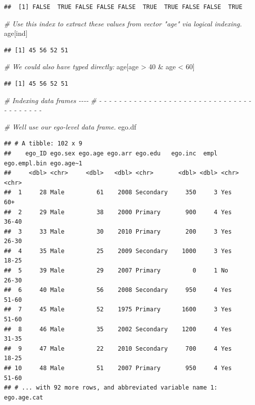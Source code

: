 \documentclass[
]{book}
\newenvironment{Shaded}{\begin{snugshade}}{\end{snugshade}}
\newcommand{\CommentTok}[1]{\textcolor[rgb]{0.56,0.35,0.01}{\textit{#1}}}
\newcommand{\DecValTok}[1]{\textcolor[rgb]{0.00,0.00,0.81}{#1}}
\newcommand{\NormalTok}[1]{#1}
\newcommand{\SpecialCharTok}[1]{\textcolor[rgb]{0.00,0.00,0.00}{#1}}
\begin{document}
\begin{verbatim}
##  [1] FALSE  TRUE FALSE FALSE FALSE  TRUE  TRUE FALSE FALSE  TRUE
\end{verbatim}

\begin{Shaded}
\begin{Highlighting}[]
\CommentTok{\# Use this index to extract these values from vector "age" via logical indexing.}
\NormalTok{age[ind]}
\end{Highlighting}
\end{Shaded}

\begin{verbatim}
## [1] 45 56 52 51
\end{verbatim}

\begin{Shaded}
\begin{Highlighting}[]
\CommentTok{\# We could also have typed directly:}
\NormalTok{age[age }\SpecialCharTok{\textgreater{}} \DecValTok{40} \SpecialCharTok{\&}\NormalTok{ age }\SpecialCharTok{\textless{}} \DecValTok{60}\NormalTok{]}
\end{Highlighting}
\end{Shaded}

\begin{verbatim}
## [1] 45 56 52 51
\end{verbatim}

\begin{Shaded}
\begin{Highlighting}[]
\CommentTok{\# Indexing data frames                                                     {-}{-}{-}{-} }
\CommentTok{\# {-} {-} {-} {-} {-} {-} {-} {-} {-} {-} {-} {-} {-} {-} {-} {-} {-} {-} {-} {-} {-} {-} {-} {-} {-} {-} {-} {-} {-} {-} {-} {-} {-} {-} {-} {-} {-} {-} {-} }

\CommentTok{\# We\textquotesingle{}ll use our ego{-}level data frame.}
\NormalTok{ego.df}
\end{Highlighting}
\end{Shaded}

\begin{verbatim}
## # A tibble: 102 x 9
##    ego_ID ego.sex ego.age ego.arr ego.edu   ego.inc  empl ego.empl.bin ego.age~1
##     <dbl> <chr>     <dbl>   <dbl> <chr>       <dbl> <dbl> <chr>        <chr>    
##  1     28 Male         61    2008 Secondary     350     3 Yes          60+      
##  2     29 Male         38    2000 Primary       900     4 Yes          36-40    
##  3     33 Male         30    2010 Primary       200     3 Yes          26-30    
##  4     35 Male         25    2009 Secondary    1000     3 Yes          18-25    
##  5     39 Male         29    2007 Primary         0     1 No           26-30    
##  6     40 Male         56    2008 Secondary     950     4 Yes          51-60    
##  7     45 Male         52    1975 Primary      1600     3 Yes          51-60    
##  8     46 Male         35    2002 Secondary    1200     4 Yes          31-35    
##  9     47 Male         22    2010 Secondary     700     4 Yes          18-25    
## 10     48 Male         51    2007 Primary       950     4 Yes          51-60    
## # ... with 92 more rows, and abbreviated variable name 1: ego.age.cat
\end{verbatim}
\end{document}

